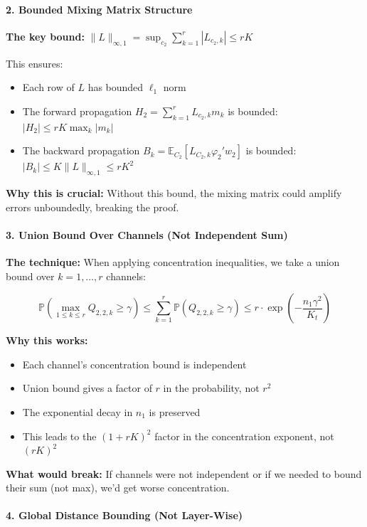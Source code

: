 \paragraph*{2. Bounded Mixing Matrix Structure}

\textbf{The key bound:} $\|L\|_{\infty,1} = \sup_{c_2}\sum_{k=1}^r |L_{c_2,k}| \le rK$

This ensures:
\begin{itemize}
\item Each row of $L$ has bounded $\ell_1$ norm
\item The forward propagation $H_2 = \sum_{k=1}^r L_{c_2,k} m_k$ is bounded: $|H_2| \le rK \max_k |m_k|$
\item The backward propagation $B_k = \mathbb{E}_{C_2}[L_{C_2,k} \varphi_2' w_2]$ is bounded: $|B_k| \le K \|L\|_{\infty,1} \le rK^2$
\end{itemize}

\textbf{Why this is crucial:} Without this bound, the mixing matrix could amplify errors unboundedly, breaking the proof.

\paragraph*{3. Union Bound Over Channels (Not Independent Sum)}

\textbf{The technique:} When applying concentration inequalities, we take a union bound over $k = 1, \ldots, r$ channels:

\[
\mathbb{P}\left(\max_{1 \le k \le r} Q_{2,2,k} \ge \gamma\right) \le \sum_{k=1}^r \mathbb{P}(Q_{2,2,k} \ge \gamma) \le r \cdot \exp\left(-\frac{n_1\gamma^2}{K_t}\right)
\]

\textbf{Why this works:}
\begin{itemize}
\item Each channel's concentration bound is independent
\item Union bound gives a factor of $r$ in the probability, not $r^2$
\item The exponential decay in $n_1$ is preserved
\item This leads to the $(1+rK)^2$ factor in the concentration exponent, not $(rK)^2$
\end{itemize}

\textbf{What would break:} If channels were not independent or if we needed to bound their sum (not max), we'd get worse concentration.

\paragraph*{4. Global Distance Bounding (Not Layer-Wise)}

